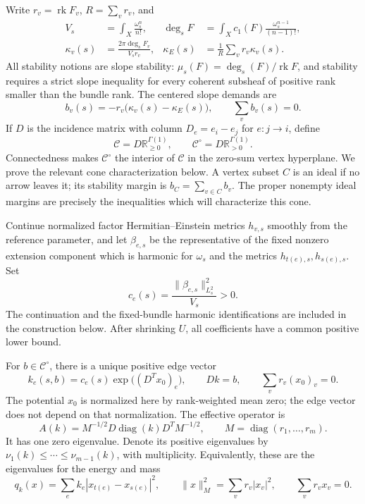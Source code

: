 \documentclass[11pt]{amsart}
\theoremstyle{definition}
\theoremstyle{remark}
\newcommand{\rk}{\operatorname{rk}}
\newcommand{\diag}{\operatorname{diag}}
\newcommand{\RR}{\mathbb R}
\newcommand{\cC}{\mathcal C}
\begin{document}
Write \(r_v=\rk F_v\), \(R=\sum_vr_v\), and
\begin{equation}\label{eq01:normalization}
\begin{aligned}
 V_s&=\int_X\frac{\omega_s^n}{n!},&
 \deg_s F&=\int_Xc_1(F)\frac{\omega_s^{n-1}}{(n-1)!},\\
 \kappa_v(s)&=\frac{2\pi\deg_s F_v}{V_sr_v},&
 \kappa_E(s)&=\frac1R\sum_vr_v\kappa_v(s).
\end{aligned}
\end{equation}
All stability notions are slope stability:
\(\mu_s(F)=\deg_s(F)/\rk F\), and stability requires a strict
slope inequality for every coherent subsheaf of positive rank
smaller than the bundle rank.
The centered slope demands are
\begin{equation}\label{eq01:demands}
 b_v(s)=-r_v\bigl(\kappa_v(s)-\kappa_E(s)\bigr),
 \qquad \sum_v b_v(s)=0.
\end{equation}
If \(D\) is the incidence matrix with column \(D_e=e_i-e_j\)
for \(e:j\to i\), define
\[
 \cC=D\RR_{\geq0}^{\Gamma(1)},\qquad
 \cC^\circ=D\RR_{>0}^{\Gamma(1)}.
\]
Connectedness makes \(\cC^\circ\) the interior of \(\cC\) in the
zero-sum vertex hyperplane. We prove the relevant cone
characterization below.
A vertex subset \(C\) is an ideal if no arrow leaves it; its
stability margin is \(b_C=\sum_{v\in C}b_v\).
The proper nonempty ideal margins are precisely the inequalities
which will characterize this cone.

Continue normalized factor Hermitian--Einstein metrics \(h_{v,s}\)
smoothly from the reference parameter, and let \(\beta_{e,s}\) be
the representative of the fixed nonzero extension component which is
harmonic for \(\omega_s\) and the metrics
\(h_{t(e),s},h_{s(e),s}\). Set
\begin{equation}\label{eq01:coefficients}
 c_e(s)=\frac{\|\beta_{e,s}\|_{L^2_s}^2}{V_s}>0.
\end{equation}
The continuation and the fixed-bundle harmonic identifications are
included in the construction below. After shrinking \(U\), all
coefficients have a common positive lower bound.

For \(b\in\cC^\circ\), there is a unique positive edge vector
\begin{equation}\label{eq01:balance}
 k_e(s,b)=c_e(s)\exp\bigl((D^Tx_0)_e\bigr),\qquad
 Dk=b,\qquad \sum_vr_v(x_0)_v=0.
\end{equation}
The potential \(x_0\) is normalized here by rank-weighted mean zero;
the edge vector does not depend on that normalization.
The effective operator is
\begin{equation}\label{eq01:graphoperator}
 A(k)=M^{-1/2}D\diag(k)D^TM^{-1/2},
 \qquad M=\diag(r_1,\ldots,r_m).
\end{equation}
It has one zero eigenvalue. Denote its positive eigenvalues by
\(\nu_1(k)\leq\cdots\leq\nu_{m-1}(k)\), with multiplicity.
Equivalently, these are the eigenvalues for the energy and mass
\begin{equation}\label{eq01:energy}
 q_k(x)=\sum_e k_e|x_{t(e)}-x_{s(e)}|^2,\qquad
 \|x\|_M^2=\sum_vr_v|x_v|^2,\qquad
 \sum_vr_vx_v=0.
\end{equation}
\end{document}
